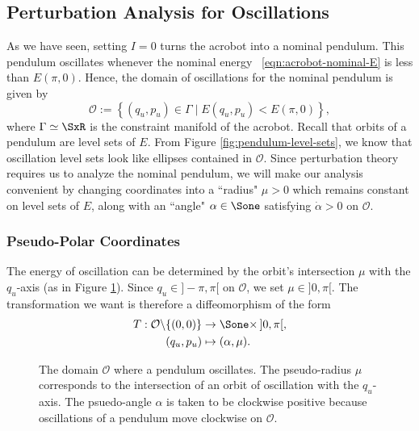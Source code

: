 \subsection{Perturbation Analysis for Oscillations}
As we have seen, setting \(I = 0\) turns the acrobot into a nominal pendulum. 
This pendulum oscillates whenever the nominal energy
~\eqref{eqn:acrobot-nominal-E} is less than \(E(\pi,0)\). 
Hence, the domain of oscillations for the nominal pendulum is given by
\[
    \mathcal{O} := \left\{ (q_u,p_u) \in \Gamma \mid E(q_u,p_u) < E(\pi,0)\right\}
    ,
\]
where \(\Gamma \simeq \SxR\) is the constraint manifold of the
acrobot.
Recall that orbits of a pendulum are level sets of \(E\). 
From Figure \ref{fig:pendulum-level-sets}, we know that oscillation level sets
look like ellipses contained in \(\mathcal{O}\).
Since perturbation theory requires us to analyze the nominal pendulum, we will
make our analysis convenient by changing coordinates into a
``radius" \(\mu > 0\) which remains constant on level sets of \(E\), 
along with an ``angle" \(\alpha \in \Sone\) satisfying \(\dot{\alpha} > 0\) on
\(\mathcal{O}\).

\subsubsection*{Pseudo-Polar Coordinates}

The energy of oscillation can be determined by the orbit's intersection
\(\mu\) with the \(q_u\)-axis (as in Figure \ref{fig:mu-intersection}).
Since \(q_u \in ]-\pi,\pi[\) on \(\mathcal{O}\), we set \(\mu \in ]0,\pi[\).
The transformation we want is therefore a diffeomorphism of the form
\begin{align*}
    T : \mathcal{O} \backslash \{(0,0)\} &\rightarrow \Sone \times \, ]0,\pi[, \\
    (q_u, p_u) &\mapsto (\alpha,\mu)
    .
\end{align*}

\begin{figure}
    \centering
    \caption{The domain \(\mathcal{O}\) where a pendulum oscillates.
    The pseudo-radius \(\mu\) corresponds to the
    intersection of an orbit of oscillation with the \(q_u\)-axis.
    The psuedo-angle \(\alpha\) is taken to be clockwise positive because 
    oscillations of a pendulum move clockwise on \(\mathcal{O}\).}
    \label{fig:mu-intersection}
\end{figure}

